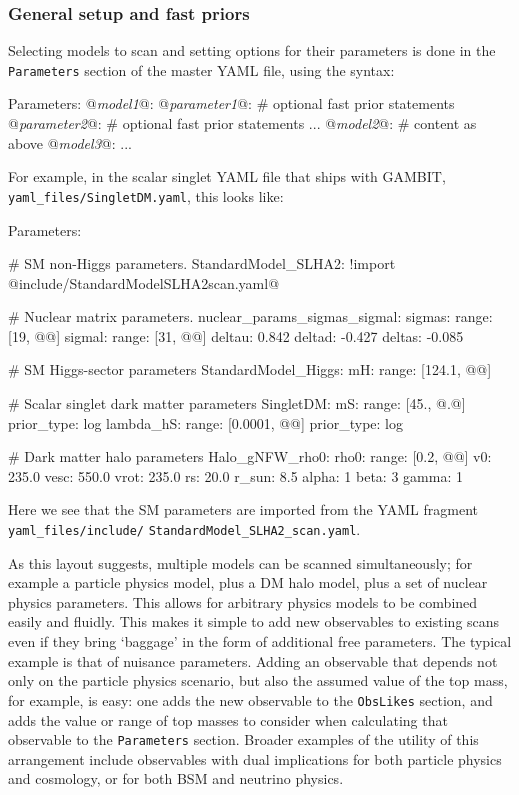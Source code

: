 \documentclass[pdftex,twocolumn,epjc3_preprint,runningheads]{svjour3}
\renewcommand{\_}{\discretionary{\underscore}{}{\underscore}}
\newcommand\yaml[1]{{\lstset{style=yaml}\lstinline!#1!\lstset{style=cpp}}}
\newcommand\yamlvalue[1]{{\YAMLvaluestyle\ttfamily#1}}
\newcommand\term[1]{{\lstset{style=terminal}\lstinline!#1!\lstset{style=cpp}}}
\newcommand\YAMLvaluestyle{\footnotesize\color{blue}\mdseries}
\newcommand{\metavarf}[1]{\textit{\color{darkgreen}\footnotesize\textrm{#1}}}
\newcommand{\metavar}{\metavarf}
\newcommand{\gambit}{\textsf{GAMBIT}\xspace}
\newcommand{\GB}{\gambit}
\newcommand\YAML{\textsf{YAML}\xspace}
\begin{document}
\subsubsection{General setup and fast priors}
\label{Parameters}

Selecting models to scan and setting options for their parameters is done in the \yaml{Parameters} section of the master \YAML file, using the syntax:
\begin{lstyaml}
Parameters:
  @\metavar{model\_1}@:
     @\metavar{parameter\_1}@:
        # optional fast prior statements
     @\metavar{parameter\_2}@:
        # optional fast prior statements
     ...
  @\metavar{model\_2}@:
     # content as above
  @\metavar{model\_3}@:
  ...
\end{lstyaml}

For example, in the scalar singlet \YAML file that ships with \GB, \term{yaml_files/SingletDM.yaml}, this looks like:
\begin{lstyaml}
Parameters:

  # SM non-Higgs parameters.
  StandardModel_SLHA2: !import
   @\yamlvalue{include/StandardModel\_SLHA2\_scan.yaml}@

  # Nuclear matrix parameters.
  nuclear_params_sigmas_sigmal:
    sigmas:
      range: [19, @\yamlvalue{67}@]
    sigmal:
      range: [31, @\yamlvalue{85}@]
    deltau:  0.842
    deltad:  -0.427
    deltas:  -0.085

  # SM Higgs-sector parameters
  StandardModel_Higgs:
    mH:
      range: [124.1, @\yamlvalue{127.3}@]

  # Scalar singlet dark matter parameters
  SingletDM:
    mS:
      range: [45., @\yamlvalue{10000.}@]
      prior_type: log
    lambda_hS:
      range: [0.0001, @\yamlvalue{10.00}@]
      prior_type: log

  # Dark matter halo parameters
  Halo_gNFW_rho0:
    rho0:
      range: [0.2, @\yamlvalue{0.8}@]
    v0: 235.0
    vesc: 550.0
    vrot: 235.0
    rs: 20.0
    r_sun: 8.5
    alpha: 1
    beta: 3
    gamma: 1
\end{lstyaml}
Here we see that the SM parameters are imported from the \YAML fragment \term{yaml_files/include/} \term{StandardModel_SLHA2_scan.yaml}.

As this layout suggests, multiple models can be scanned simultaneously; for example a particle physics model, plus a DM halo model, plus a set of nuclear physics parameters. This allows for arbitrary physics models to be combined easily and fluidly.  This makes it simple to add new observables to existing scans even if they bring `baggage' in the form of additional free parameters.  The typical example is that of nuisance parameters.  Adding an observable that depends not only on the particle physics scenario, but also the assumed value of the top mass, for example, is easy: one adds the new observable to the \yaml{ObsLikes} section, and adds the value or range of top masses to consider when calculating that observable to the \yaml{Parameters} section.  Broader examples of the utility of this arrangement include observables with dual implications for both particle physics and cosmology, or for both BSM and neutrino physics.
\end{document}
